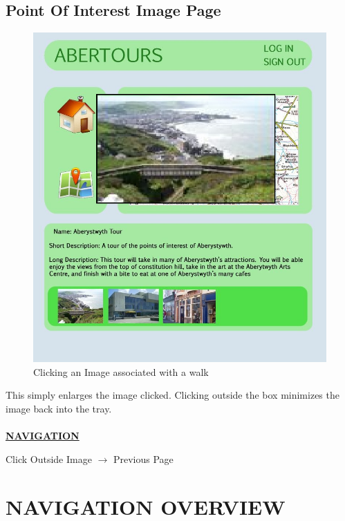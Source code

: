 \documentclass[12pt]{article}
\begin{document}
\subsection{Point Of Interest Image Page}
\begin{figure}[htp]
\centering
\includegraphics[scale=0.50]{Project_Plan/Web/walk_image_clicked_01.jpg}
\caption{Clicking an Image associated with a walk}
\label{Clicking an Image associated with a walk}
\end{figure}
\par{This simply enlarges the image clicked. Clicking outside the box minimizes the image back into the tray. \\ \\}
\textbf{\uline{NAVIGATION}}
\par{Click Outside Image $\rightarrow$ Previous Page}
\section{NAVIGATION OVERVIEW}
\end{document}
